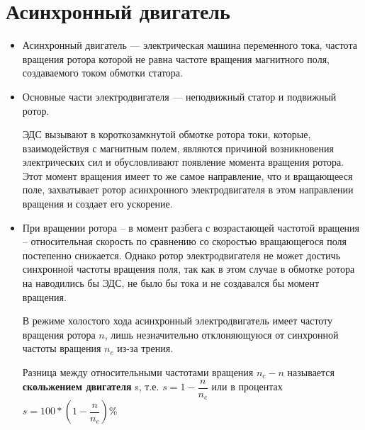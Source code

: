 \section{Асинхронный двигатель}

\begin{itemize}
\item
Асинхронный двигатель --- электрическая машина переменного тока, частота вращения ротора которой не равна частоте вращения магнитного поля, создаваемого током обмотки статора.

\item
Основные части электродвигателя --- неподвижный статор и подвижный ротор.

ЭДС вызывают в короткозамкнутой обмотке ротора токи, которые, взаимодействуя с магнитным полем, являются причиной возникновения электрических сил и обусловливают появление момента вращения ротора. Этот момент вращения имеет то же самое направление, что и вращающееся поле, захватывает ротор асинхронного электродвигателя в этом направлении вращения и создает его ускорение.

\item
При вращении ротора -- в момент разбега с возрастающей частотой вращения -- относительная скорость по сравнению со скоростью вращающегося поля постепенно снижается. Однако ротор электродвигателя не может достичь синхронной частоты вращения поля, так как в этом случае в обмотке ротора на наводились бы ЭДС, не было бы тока и не создавался бы момент вращения.

В режиме холостого хода асинхронный электродвигатель имеет частоту вращения ротора $ n $, лишь незначительно отклоняющуюся от синхронной частоты вращения $ n_c $ из-за трения. 

Разница между относительными частотами вращения $ n_c - n $ называется \textbf{скольжением двигателя} s, т.е. $ s = 1 - \dfrac{n}{n_c} $ или в процентах $ s = 100 * (1- \dfrac{n}{n_c})\% $

\end{itemize}
